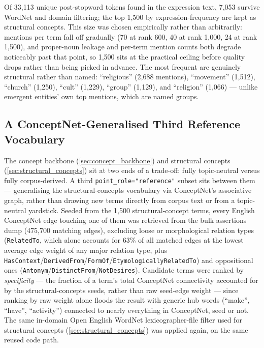 Of 33{,}113 unique post-stopword tokens found in the expression text, 7{,}053 survive WordNet and domain filtering; the top 1{,}500 by expression-frequency are kept as structural concepts. This size was chosen empirically rather than arbitrarily: mentions per term fall off gradually (70 at rank 600, 40 at rank 1{,}000, 24 at rank 1{,}500), and proper-noun leakage and per-term mention counts both degrade noticeably past that point, so 1{,}500 sits at the practical ceiling before quality drops rather than being picked in advance. The most frequent are genuinely structural rather than named: \enquote{religious} (2{,}688 mentions), \enquote{movement} (1{,}512), \enquote{church} (1{,}250), \enquote{cult} (1{,}229), \enquote{group} (1{,}129), and \enquote{religion} (1{,}066) — unlike emergent entities' own top mentions, which are named groups.

\subsection{A ConceptNet-Generalised Third Reference Vocabulary}\label{sec:conceptnet_concepts}
The concept backbone (\ref{sec:concept_backbone}) and structural concepts (\ref{sec:structural_concepts}) sit at two ends of a trade-off: fully topic-neutral versus fully corpus-derived. A third \texttt{point\_role="reference"} subset sits between them — generalising the structural-concepts vocabulary via ConceptNet's \autocite{speerConceptNet55Open2018} associative graph, rather than drawing new terms directly from corpus text or from a topic-neutral yardstick. Seeded from the 1,500 structural-concept terms, every English ConceptNet edge touching one of them was retrieved from the bulk assertions dump (475,700 matching edges), excluding loose or morphological relation types (\texttt{RelatedTo}, which alone accounts for 63\% of all matched edges at the lowest average edge weight of any major relation type, plus \texttt{HasContext}/\texttt{DerivedFrom}/\texttt{FormOf}/\texttt{EtymologicallyRelatedTo}) and oppositional ones (\texttt{Antonym}/\texttt{DistinctFrom}/\texttt{NotDesires}). Candidate terms were ranked by \textit{specificity} — the fraction of a term's total ConceptNet connectivity accounted for by the structural-concepts seeds, rather than raw seed-edge weight — since ranking by raw weight alone floods the result with generic hub words (\enquote{make}, \enquote{have}, \enquote{activity}) connected to nearly everything in ConceptNet, seed or not. The same in-domain Open English WordNet lexicographer-file filter used for structural concepts (\ref{sec:structural_concepts}) was applied again, on the same reused code path.

